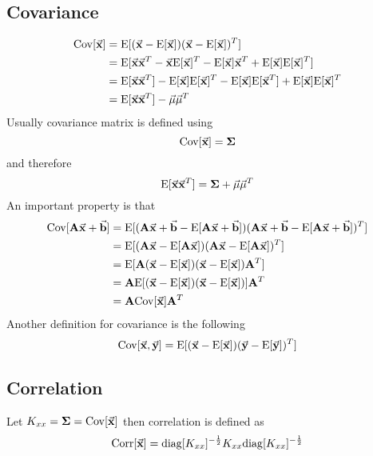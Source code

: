 \documentclass[../main.tex]{subfiles}
\begin{document}
\subsection{Covariance}
\begin{align*}
    \cov{\vec{x}} &= \e{ (\vec{x}-\e{\vec{x}}) (\vec{x}-\e{\vec{x}})^T }\\
    &= \e{ \vec{x}\vec{x}^T - \vec{x}\e{\vec{x}}^T - \e{\vec{x}}\vec{x}^T + \e{\vec{x}}\e{\vec{x}}^T }\\
    &= \e{ \vec{x}\vec{x}^T }
        - \e{\vec{x}}\e{\vec{x}}^T
        - \e{\vec{x}}\e{\vec{x}^T}
        + \e{\vec{x}}\e{\vec{x}}^T\\
    &= \e{ \vec{x}\vec{x}^T } - \vec{\mu}\vec{\mu}^T
\end{align*}
Usually covariance matrix is defined using 
$$\cov{\vec{x}} = \mat{\Sigma}$$ 
and therefore
$$\e{\vec{x}\vec{x}^T}=\mat{\Sigma}+\vec{\mu}\vec{\mu}^T$$
An important property is that
\begin{align*}
    \cov{\mat{A}\vec{x}+\vec{b}} 
    &= \e{ (\mat{A}\vec{x}+\vec{b}-\e{\mat{A}\vec{x}+\vec{b}})
        (\mat{A}\vec{x}+\vec{b}-\e{\mat{A}\vec{x}+\vec{b}})^T }\\
    &= \e{ (\mat{A}\vec{x}-\e{\mat{A}\vec{x}})
        (\mat{A}\vec{x}-\e{\mat{A}\vec{x}})^T }\\
    &= \e{ \mat{A}(\vec{x}-\e{\vec{x}})
        (\vec{x}-\e{\vec{x}})\mat{A}^T }\\
    &= \mat{A}\e{ (\vec{x}-\e{\vec{x}})
        (\vec{x}-\e{\vec{x}}) }\mat{A}^T\\
    &= \mat{A}\cov{\vec{x}}\mat{A}^T\\
\end{align*}
Another definition for covariance is the following
\begin{equation*}
    \covv{\vec{x}}{\vec{y}} = \e{ (\vec{x}-\e{\vec{x}}) (\vec{y}-\e{\vec{y}})^T }\\
\end{equation*}

\subsection{Correlation}
Let $K_{xx}=\mat{\Sigma}=\cov{\vec{x}}$ then correlation is defined as
\begin{equation*}
    \corr{\vec{x}} = \diag{K_{xx}}^{-\frac{1}{2}} K_{xx} \diag{K_{xx}}^{-\frac{1}{2}}
\end{equation*}
\end{document}
